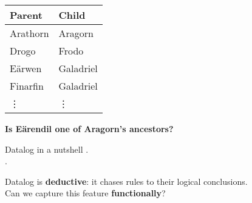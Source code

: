 \documentclass[xcolor=table,usenames,dvipsnames,svgnames]{beamer}
\begin{document}

\begin{frame} \large \centering

  \begin{tabular}{l@{\hskip 1.5em}l}
    \textbf{Parent} & \textbf{Child}\\\midrule
    Arathorn & Aragorn\\
    Drogo & Frodo\\
    E\"arwen & Galadriel\\
    Finarfin & Galadriel\\
    \hfill\vdots & \hfill\vdots
  \end{tabular}

  \vspace{2em}

  {\Large \bf Is E\"arendil one of Aragorn's ancestors?}

\end{frame}


\newcommand{\atom}[1]{\textcolor{brown}{#1}}
\begin{frame}{Datalog in a nutshell}
  \large
  \atom{}
  \atom{}.
  \\\vspace{1em}
  \atom{}
  \atom{}
  \atom{}.

\end{frame}



\begin{frame}\Large
  Datalog is \textbf{deductive}: it chases rules to their logical conclusions.
  \\\vspace{2em}
  Can we capture this feature \textbf{functionally}?
\end{frame}
\end{document}
